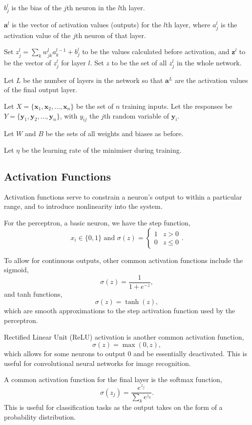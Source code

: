 \documentclass[honours,12pt]{unswthesis}
\numberwithin{equation}{section}
\begin{document}
$b_j^l$ is the bias of the $j$th neuron in the $l$th layer.

$\mathbf{a}^l$ is the vector of activation values (outputs) for the $l$th layer, where $a_j^l$ is the activation value of the $j$th neuron of that layer.

Set $z_j^l = \sum_k w_{jk}^la_k^{l-1} + b_j^l$ to be the values calculated before activation, and $\mathbf{z}^l$ to be the vector of $z_j^l$ for layer $l$. Set $z$ to be the set of all $z_j^l$ in the whole network.

Let $L$ be the number of layers in the network so that $\mathbf{a}^L$ are the activation values of the final output layer.

Let $X = \{\mathbf{x}_1, \mathbf{x}_2, \ldots, \mathbf{x}_n\}$ be the set of $n$ training inputs. Let the responses be $Y = \{\mathbf{y}_1, \mathbf{y}_2, \ldots, \mathbf{y}_n\}$, with $y_{ij}$ the $j$th random variable of $\mathbf{y}_i$.

Let $W$ and $B$ be the sets of all weights and biases as before.

Let $\eta$ be the learning rate of the minimiser during training.

\subsection{Activation Functions}\label{nnets-act}

Activation functions serve to constrain a neuron's output to within a particular range, and to introduce nonlinearity into the system. 

For the perceptron, a basic neuron, we have the step function,
\[
	x_i \in \{0,1\} \text{ and } \sigma(z) = \begin{cases}
		1 & z > 0 \\
		0 & z \le 0
	\end{cases}.
\]

To allow for continuous outputs, other common activation functions include the sigmoid,
\[
	\sigma(z) = \dfrac{1}{1+e^{-z}},
\]
and tanh functions,
\[
	\sigma(z) = \tanh(z),
\]
which are smooth approximations to the step activation function used by the perceptron.

Rectified Linear Unit (ReLU) activation is another common activation function,
\[
	\sigma(z) = \max(0, z),
\]
which allows for some neurons to output 0 and be essentially deactivated. This is useful for convolutional neural networks for image recognition.

A common activation function for the final layer is the softmax function,
\[
	\sigma(z_j) = \dfrac{e^{z_j}}{\sum_ke^{z_k}}.
\]
This is useful for classification tasks as the output takes on the form of a probability distribution.
\end{document}
